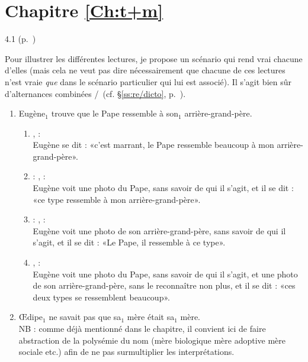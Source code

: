 \protect \section {Chapitre \protect \ref {Ch:t+m}}
\begin{Solution}{4.{1}}
(p.~\pageref{exo:derededicto})\label{crg:derededicto}

Pour illustrer les différentes lectures, je propose un scénario qui rend vrai chacune d'elles (mais cela ne veut pas dire nécessairement que chacune de ces lectures n'est vraie \emph{que} dans le scénario particulier qui lui est associé).  Il s'agit bien sûr d'alternances combinées \dedicto/\dere\ (cf. \S\ref{ss:re/dicto}, p.~\pageref{p.re/dicto}).

\begin{enumerate}
\item Eugène$_1$ trouve que le Pape ressemble à son$_1$ arrière-grand-père.
  \begin{enumerate}
  \item {},  : \dedicto\\
  Eugène se dit : «c'est marrant, le Pape ressemble beaucoup à mon arrière-grand-père».
  \item {} : \dere,  : \dedicto\\
  Eugène voit une photo du Pape, sans savoir de qui il s'agit, et il se dit : «ce type ressemble à mon arrière-grand-père».
  \item {} : \dedicto,  : \dere\\
  Eugène voit une photo de son arrière-grand-père, sans savoir de qui il s'agit, et il se dit : «Le Pape, il ressemble à ce type».
  \item {},  : \dere\\
  Eugène voit une photo du Pape, sans savoir de qui il s'agit, et une photo de son arrière-grand-père, sans le reconnaître non plus, et il se dit : «ces deux types se ressemblent beaucoup».
  \end{enumerate}

\item \OE dipe$_1$ ne {savait} pas que {sa$_1$ mère} était {sa$_1$ mère}.
\\
NB : comme déjà mentionné dans le chapitre, il convient ici de faire abstraction de la polysémie du nom  (mère biologique {\vs} mère adoptive {\vs} mère sociale etc.) afin de ne pas surmultiplier les interprétations.


\end{enumerate}
\end{Solution}
